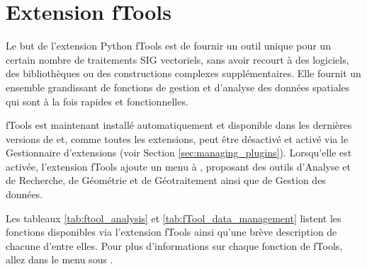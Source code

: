 \section{Extension fTools}\label{sec:ftools}


Le but de l'extension Python fTools est de fournir un outil unique pour un certain nombre de traitements SIG vectoriels, sans avoir recourt à des logiciels, des bibliothèques ou des constructions complexes supplémentaires. Elle fournit un ensemble grandissant de fonctions de gestion et d'analyse des données spatiales qui sont à la fois rapides et fonctionnelles.

fTools est maintenant installé automatiquement et disponible dans les dernières versions de \qg et, comme toutes les extensions, peut être désactivé et activé via le Gestionnaire d'extensions (voir Section \ref{sec:managing_plugins}). Lorsqu'elle est activée, l'extension fTools ajoute un menu  à \qg, proposant des outils d'Analyse et de Recherche, de Géométrie et de Géotraitement ainsi que de Gestion des données.

\label{ftool_functions}

Les tableaux \ref{tab:ftool_analysis} et \ref{tab:fTool_data_management} listent les fonctions disponibles via l'extension fTools ainsi qu'une brève description de chacune d'entre elles. Pour plus d'informations sur chaque fonction de fTools, allez dans le menu  sous .

